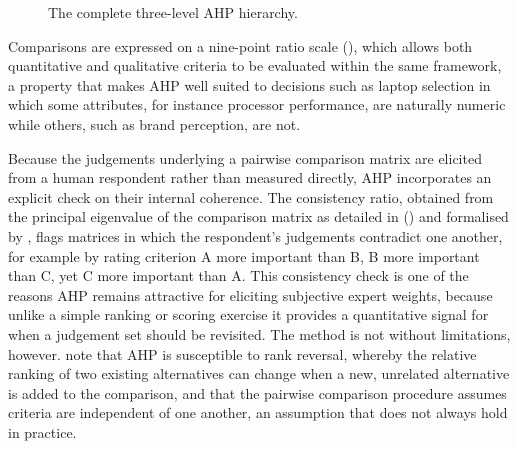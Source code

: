 \begin{figure}[htbp]
  \centering
  \caption{The complete three-level AHP hierarchy.}
  \label{fig:ahp-hierarchy}
\end{figure}

Comparisons are expressed on a
nine-point ratio scale (), which allows both quantitative and qualitative criteria
to be evaluated within the same framework, a property that makes AHP well suited to decisions such
as laptop selection in which some attributes, for instance processor performance, are naturally
numeric while others, such as brand perception, are not.

Because the judgements underlying a pairwise comparison matrix are elicited from a human
respondent rather than measured directly, AHP incorporates an explicit check on their internal
coherence. The consistency ratio, obtained from the principal eigenvalue of the comparison matrix
as detailed in  () and formalised by \textcite{Saaty2008DECISIONMW},
flags matrices in which the respondent's judgements
contradict one another, for example by rating criterion A more important than B, B more important
than C, yet C more important than A. This consistency check is one of the reasons AHP remains
attractive for eliciting subjective expert weights, because unlike a simple ranking or scoring
exercise it provides a quantitative signal for when a judgement set should be revisited. The method is not
without limitations, however. \textcite{zyoud_bibliometric-based_2017} note that AHP is susceptible
to rank reversal, whereby the relative ranking of two existing alternatives can change when a new,
unrelated alternative is added to the comparison, and that the pairwise comparison procedure
assumes criteria are independent of one another, an assumption that does not always hold in
practice.

